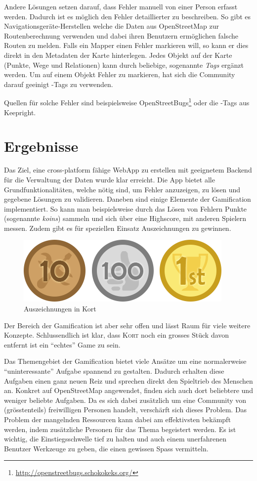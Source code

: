 Andere Lösungen setzen darauf, dass Fehler manuell von einer Person erfasst werden. Dadurch ist es möglich den Fehler detaillierter zu beschreiben. 
So gibt es Navigationsgeräte-Herstellen welche die Daten aus \gls{OpenStreetMap} zur Routenberechnung verwenden und dabei ihren Benutzern ermöglichen falsche Routen zu melden.
Falls ein \gls{Mapper} einen Fehler markieren will, so kann er dies direkt in den Metadaten der Karte hinterlegen. Jedes Objekt auf der Karte (Punkte, Wege und Relationen) kann durch beliebige, sogenannte  \emph{Tags} ergänzt werden.
Um auf einem Objekt Fehler zu markieren, hat sich die Community darauf geeinigt -Tags zu verwenden.

Quellen für solche Fehler sind beispielsweise OpenStreetBugs\footnote{\url{http://openstreetbugs.schokokeks.org/}} oder die -Tags aus Keepright.

\section*{Ergebnisse}
Das Ziel, eine cross-platform fähige \gls{WebApp} zu erstellen mit geeignetem Backend für die Verwaltung der Daten wurde klar erreicht.
Die App bietet alle Grundfunktionalitäten, welche nötig sind, um Fehler anzuzeigen, zu lösen und gegebene Lösungen zu validieren.
Daneben sind einige Elemente der Gamification implementiert. So kann man beispielsweise durch das Lösen von Fehlern Punkte (sogenannte \emph{koins}) sammeln und sich über eine Highscore, mit anderen Spielern messen.
Zudem gibt es für speziellen Einsatz Auszeichnungen zu gewinnen.

\begin{figure}[H]
	\centering
	\includegraphics[scale=0.6]{images/gamification/gamification-badges}
	\caption{Auszeichnungen in Kort}
	\label{image-kort-badges}
\end{figure}

Der Bereich der Gamification ist aber sehr offen und lässt Raum für viele weitere Konzepte. Schlussendlich ist klar, dass \textsc{Kort} noch ein grosses Stück davon entfernt ist ein "`echtes"' Game zu sein.

Das Themengebiet der Gamification bietet viele Ansätze um eine normalerweise "`uninteressante"' Aufgabe spannend zu gestalten.
Dadurch erhalten diese Aufgaben einen ganz neuen Reiz und sprechen direkt den Spieltrieb des Menschen an.
Konkret auf \gls{OpenStreetMap} angewendet, finden sich auch dort beliebtere und weniger beliebte Aufgaben.
Da es sich dabei zusätzlich um eine Community von (grösstenteils) freiwilligen Personen handelt, verschärft sich dieses Problem.
Das Problem der mangelnden Ressourcen kann dabei am effektivsten bekämpft werden, indem zusätzliche Personen für das Thema begeistert werden.
Es ist wichtig, die Einstiegsschwelle tief zu halten und auch einem unerfahrenen Benutzer Werkzeuge zu geben, die einen gewissen Spass vermitteln.

